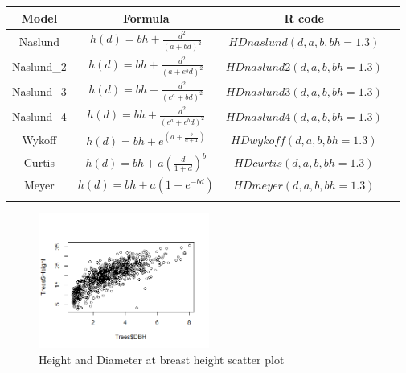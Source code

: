 \documentclass[a4paper,11pt,twoside]{report}
\begin{document}
   \begin{tabu}  spread \linewidth {|c|c|c|c|}\hline
        \rowfont{\bfseries}
          Model & Formula & R code  \\ \hline
     Naslund & $\displaystyle h(d)=bh + \frac{d^2}{(a+bd)^2}$ & $ HDnaslund(d, a, b, bh=1.3)$ \\ \hline
     Naslund_2 & $\displaystyle h(d)=bh +  \frac{d^2}{(a+e^{b}d)^2}$ & $HDnaslund2(d, a, b, bh=1.3)$  \\ \hline
     Naslund_3 & $\displaystyle h(d) = bh +  \frac{d^2}{(e^{a}+bd)^2}$ & $HDnaslund3(d, a, b, bh=1.3)$ \\ \hline
     Naslund_4 & $\displaystyle h(d) = bh +  \frac{d^2}{(e^{a}+e^{b}d)^2}$ & $HDnaslund4(d, a, b, bh=1.3)$ \\ \hline
     Wykoff & $\displaystyle h(d)=bh +  e^{(a + \frac{b}{d+1})}$ & $ HDwykoff(d, a, b, bh=1.3)$\\ \hline 
     Curtis & $\displaystyle h(d) = bh + a(\frac{d}{1+d})^b $ & $HDcurtis(d,a,b,bh=1.3)$\\ \hline
     Meyer & $\displaystyle h(d) = bh + a(1-e^{-bd})$ & $HDmeyer(d,a,b,bh=1.3)$\\ \hline 
      \label{tabu:Models}
   \end{tabu} 


\begin{figure}[thb]
	\centering
		\caption[Height_DBH]{Height and Diameter at breast height scatter plot}
	\label{fig:Height}
	\includegraphics[width=0.5\textwidth]{Images/Height_DBH.png}
	
\end{figure}
\end{document}
